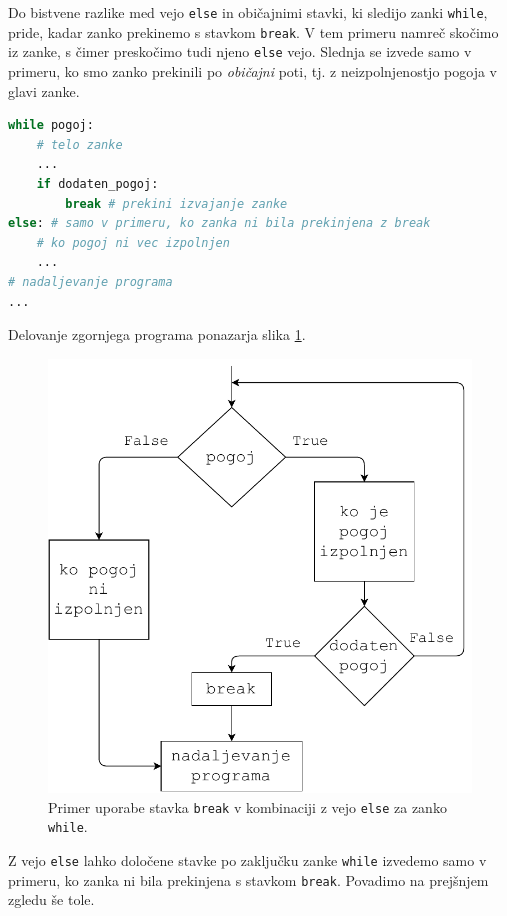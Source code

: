 Do bistvene razlike med vejo \texttt{else} in običajnimi stavki, ki sledijo zanki \texttt{while}, pride, kadar zanko prekinemo s stavkom \texttt{break}. V tem primeru namreč skočimo iz zanke, s čimer preskočimo tudi njeno \texttt{else} vejo. Slednja se izvede samo v primeru, ko smo zanko prekinili po \emph{običajni} poti, tj. z neizpolnjenostjo pogoja v glavi zanke.  
\begin{lstlisting}[language=Python, showstringspaces=false]
while pogoj:
    # telo zanke
    ...
    if dodaten_pogoj:
        break # prekini izvajanje zanke
else: # samo v primeru, ko zanka ni bila prekinjena z break
    # ko pogoj ni vec izpolnjen
    ...
# nadaljevanje programa
...
\end{lstlisting}
Delovanje zgornjega programa ponazarja slika \ref{img:while3}.
\begin{figure}
    \centering
    \includegraphics[width=0.5\linewidth]{img/while3.pdf}
    \caption{Primer uporabe stavka \texttt{break} v kombinaciji z vejo \texttt{else} za zanko \texttt{while}.}
    \label{img:while3}
\end{figure}
Z vejo \texttt{else} lahko določene stavke po zaključku zanke \texttt{while} izvedemo samo v primeru, ko zanka ni bila prekinjena s stavkom \texttt{break}. Povadimo na prejšnjem zgledu še tole.


